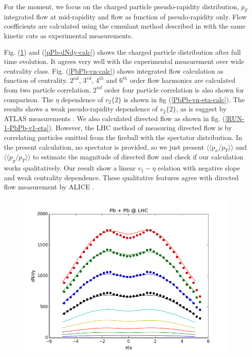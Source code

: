 \documentclass[aps,prl,twocolumn,groupedaddress]{revtex4-1}
\begin{document}
	For the moment, we focus on the charged particle pseudo-rapidity distribution, $p_T$ integrated flow at mid-rapidity and flow as function of pseudo-rapidity only. 
	Flow coefficients are calculated using the cumulant method described in \citep{Bilandzic:2011Flow-calc} with the same kinetic cuts as experimental measurements.
	
	Fig. (\ref{PbPb-dNdy-calc}) and  (\ref{pPb-dNdy-calc}) shows the charged particle distribution after full time evolution. 
	It agrees very well with the experimental measurement over wide centrality class. 
	Fig. (\ref{PbPb-vn-calc}) shows integrated flow calculation as function of centrality. 
	$2^{nd}$, $3^{rd}$, $4^{th}$ and $6^{th}$ order flow harmonics are calculated from two particle correlation. $2^{nd}$ order four particle correlation is also shown for comparison.
	The $\eta$ dependence of $v_2\{2\}$ is shown in fig (\ref{PbPb-vn-eta-calc}). The results shows a weak pseudo-rapidity dependence of $v_2\{2\}$, as is suggest by ATLAS measurements \citep{ATLAS:2014vn-eta}.
	We also calculated directed flow as shown in fig. (\ref{RUN-1-PbPb-v1-eta}). 
	However, the LHC method of measuring directed flow is by correlating particles emitted from the fireball with the spectator distribution.
	In the present calculation, no spectator is provided, so we just present $\langle\langle  p_x/p_T \rangle\rangle$ and $\langle\langle p_y/p_T\rangle\rangle$ to estimate the magnitude of directed flow and check if our calculation works qualitatively.
	Our result show a linear $v_1-\eta$ relation with negative slope and weak centrality dependence.
	These qualitative features agree with directed flow measurement by ALICE \citep{ALCIE:v1-eta}.
	\begin{figure}
  	\centering
	\includegraphics[width=\columnwidth]{pics/RUN-1-PbPb-dNdy-eta.png}
  	\caption{}
  	\label{PbPb-dNdy-calc}
	\end{figure}
	
\end{document}
